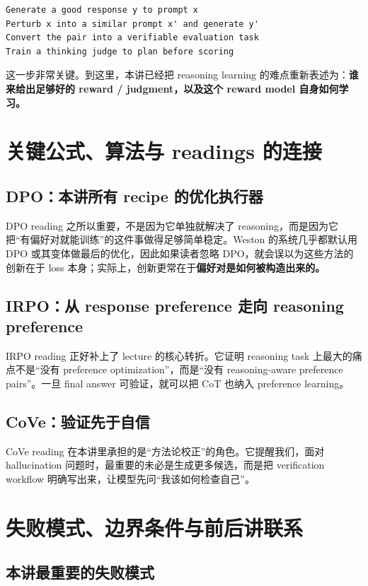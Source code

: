 \begin{lstlisting}
Generate a good response y to prompt x
Perturb x into a similar prompt x' and generate y'
Convert the pair into a verifiable evaluation task
Train a thinking judge to plan before scoring
\end{lstlisting}

这一步非常关键。到这里，本讲已经把 reasoning learning 的难点重新表述为：\textbf{谁来给出足够好的 reward / judgment，以及这个 reward model 自身如何学习。}

\section{关键公式、算法与 readings 的连接}

\subsection{DPO：本讲所有 recipe 的优化执行器}

DPO reading 之所以重要，不是因为它单独就解决了 reasoning，而是因为它把“有偏好对就能训练”的这件事做得足够简单稳定。Weston 的系统几乎都默认用 DPO 或其变体做最后的优化，因此如果读者忽略 DPO，就会误以为这些方法的创新在于 loss 本身；实际上，创新更常在于\textbf{偏好对是如何被构造出来的。}

\subsection{IRPO：从 response preference 走向 reasoning preference}

IRPO reading 正好补上了 lecture 的核心转折。它证明 reasoning task 上最大的痛点不是“没有 preference optimization”，而是“没有 reasoning-aware preference pairs”。一旦 final answer 可验证，就可以把 CoT 也纳入 preference learning。

\subsection{CoVe：验证先于自信}

CoVe reading 在本讲里承担的是“方法论校正”的角色。它提醒我们，面对 hallucination 问题时，最重要的未必是生成更多候选，而是把 verification workflow 明确写出来，让模型先问“我该如何检查自己”。

\section{失败模式、边界条件与前后讲联系}

\subsection{本讲最重要的失败模式}

